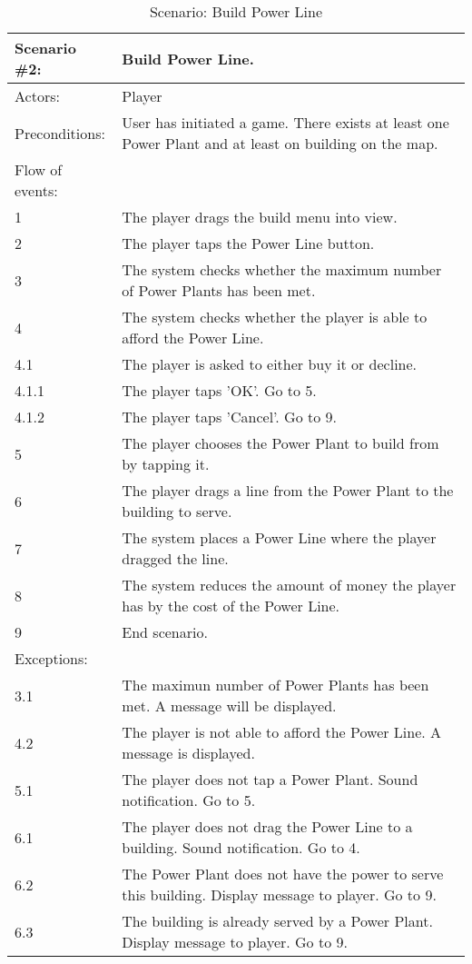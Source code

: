 \begin{table}
	\begin{tabular}{| l | p{10cm} |}
		\hline
		\rowcolor{lightgray}
		{\bf Scenario \#2:} & {\bf Build Power Line.} \\ \hline
		Actors: & Player \\ \hline
		Preconditions: & User has initiated a game. There exists at least one Power Plant and at least on building on the map. \\ \hline
		Flow of events: & \\ \hline
		1 & The player drags the build menu into view. \\ \hline
		2 & The player taps the Power Line button. \\ \hline
		3 & The system checks whether the maximum number of Power Plants has been met. \\ \hline
		4 & The system checks whether the player is able to afford the Power Line. \\ \hline
		4.1 & The player is asked to either buy it or decline. \\ \hline
		4.1.1 & The player taps 'OK'. Go to 5. \\ \hline
		4.1.2 & The player taps 'Cancel'. Go to 9. \\ \hline
		5 & The player chooses the Power Plant to build from by tapping it. \\ \hline
		6 & The player drags a line from the Power Plant to the building to serve. \\ \hline
		7 & The system places a Power Line where the player dragged the line. \\ \hline
		8 & The system reduces the amount of money the player has by the cost of the Power Line. \\ \hline
		9 & End scenario. \\ \hline
		Exceptions: & \\ \hline
		3.1 & The maximun number of Power Plants has been met. A message will be displayed. \\ \hline
		4.2 & The player is not able to afford the Power Line. A message is displayed. \\ \hline
		5.1 & The player does not tap a Power Plant. Sound notification. Go to 5. \\ \hline
		6.1 & The player does not drag the Power Line to a building. Sound notification. Go to 4. \\ \hline
		6.2 & The Power Plant does not have the power to serve this building. Display message to player. Go to 9. \\ \hline
		6.3 & The building is already served by a Power Plant. Display message to player. Go to 9. \\ \hline
	\end{tabular}
\caption{Scenario: Build Power Line}
\end{table}

